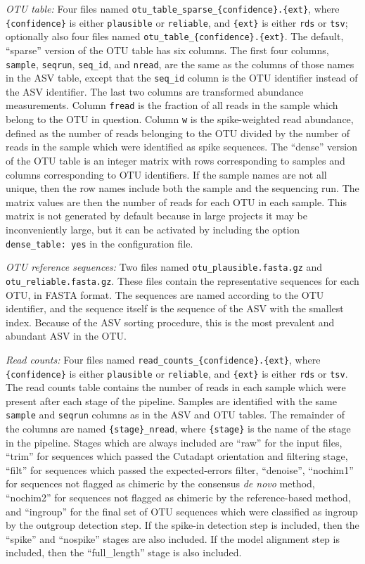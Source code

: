 \documentclass[
]{article}
\begin{document}
\emph{OTU table:} Four files named \texttt{otu\_table\_sparse\_\{confidence\}.\{ext\}}, where \texttt{\{confidence\}} is either \texttt{plausible} or \texttt{reliable}, and \texttt{\{ext\}} is either \texttt{rds} or \texttt{tsv};
optionally also four files named \texttt{otu\_table\_\{confidence\}.\{ext\}}.
The default, ``sparse'' version of the OTU table has six columns.
The first four columns, \texttt{sample}, \texttt{seqrun}, \texttt{seq\_id}, and \texttt{nread}, are the same as the columns of those names in the ASV table, except that the \texttt{seq\_id} column is the OTU identifier instead of the ASV identifier.
The last two columns are transformed abundance measurements.
Column \texttt{fread} is the fraction of all reads in the sample which belong to the OTU in question.
Column \texttt{w} is the spike-weighted read abundance, defined as the number of reads belonging to the OTU divided by the number of reads in the sample which were identified as spike sequences.
The ``dense'' version of the OTU table is an integer matrix with rows corresponding to samples and columns corresponding to OTU identifiers.
If the sample names are not all unique, then the row names include both the sample and the sequencing run.
The matrix values are then the number of reads for each OTU in each sample.
This matrix is not generated by default because in large projects it may be inconveniently large, but it can be activated by including the option \texttt{dense\_table:\ yes} in the configuration file.

\emph{OTU reference sequences:} Two files named \texttt{otu\_plausible.fasta.gz} and \texttt{otu\_reliable.fasta.gz}.
These files contain the representative sequences for each OTU, in FASTA format.
The sequences are named according to the OTU identifier, and the sequence itself is the sequence of the ASV with the smallest index.
Because of the ASV sorting procedure, this is the most prevalent and abundant ASV in the OTU.

\emph{Read counts:} Four files named \texttt{read\_counts\_\{confidence\}.\{ext\}}, where \texttt{\{confidence\}} is either \texttt{plausible} or \texttt{reliable}, and \texttt{\{ext\}} is either \texttt{rds} or \texttt{tsv}.
The read counts table contains the number of reads in each sample which were present after each stage of the pipeline.
Samples are identified with the same \texttt{sample} and \texttt{seqrun} columns as in the ASV and OTU tables.
The remainder of the columns are named \texttt{\{stage\}\_nread}, where \texttt{\{stage\}} is the name of the stage in the pipeline.
Stages which are always included are ``raw'' for the input files, ``trim'' for sequences which passed the Cutadapt orientation and filtering stage, ``filt'' for sequences which passed the expected-errors filter, ``denoise'', ``nochim1'' for sequences not flagged as chimeric by the consensus \emph{de novo} method, ``nochim2'' for sequences not flagged as chimeric by the reference-based method, and ``ingroup'' for the final set of OTU sequences which were classified as ingroup by the outgroup detection step.
If the spike-in detection step is included, then the ``spike'' and ``nospike'' stages are also included.
If the model alignment step is included, then the ``full\_length'' stage is also included.
\end{document}
